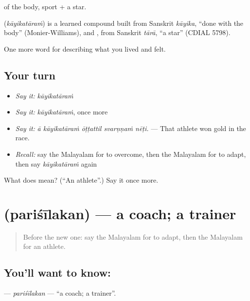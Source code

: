  of the body, sport +  a star.

\begin{cousinweb}
\textbf{} (\emph{kāyikatāraṁ}) is a learned compound built from Sanskrit \emph{kāyika}, \textquotedblleft{}done with the body\textquotedblright{} (Monier-Williams), and , from Sanskrit \emph{tārā}, \textquotedblleft{}a star\textquotedblright{} (CDIAL 5798).
\end{cousinweb}

\begin{grammarlens}[title={What you've built}]
One more word for describing what you lived and felt.
\end{grammarlens}

\subsection*{Your turn}
\begin{itemize}
\raggedright
  \item \emph{Say it:} \emph{kāyikatāraṁ}
  \item \emph{Say it:} \emph{kāyikatāraṁ}, once more
  \item \emph{Say it:} \emph{ā kāyikatāraṁ ōṭṭattil svarṇṇaṁ nēṭi.} — That athlete won gold in the race.
  \item \emph{Recall:} say the Malayalam for to overcome, then the Malayalam for to adapt, then say \emph{kāyikatāraṁ} again
\end{itemize}

\begin{tcolorbox}[breakable,colback=teal!4,colframe=teal!35!black,title={Before you move on}]
What does  mean? (\textquotedblleft{}An athlete\textquotedblright{}.) Say it once more.
\end{tcolorbox}
\section[\texorpdfstring{\ml{പരിശീലകൻ} (pariśīlakan)}{പരിശീലകൻ (pariśīlakan)}]{ (pariśīlakan) — a coach; a trainer}

\label{lesson:ML-C568-parisilakan}



\begin{quote}
Before the new one: say the Malayalam for to adapt, then the Malayalam for an athlete.
\end{quote}

\subsection*{You'll want to know: }
\textbf{} — \emph{pariśīlakan} — \textquotedblleft{}a coach; a trainer\textquotedblright{}.

